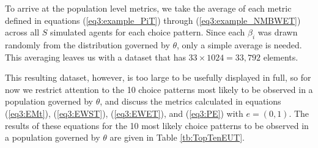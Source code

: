 \documentclass[../main.tex]{subfiles}
\begin{document}
To arrive at the population level metrics, we take the average of each metric defined in equations (\ref{eq3:example_PiT}) through (\ref{eq3:example_NMBWET}) across all $S$ simulated agents for each choice pattern.
Since each $\beta_i$ was drawn randomly from the distribution governed by $\theta$, only a simple average is needed.
This averaging leaves us with a dataset that has $33 \times 1024 = 33,792$ elements.

This resulting dataset, however, is too large to be usefully displayed in full, so for now we restrict attention to the 10 choice patterns most likely to be observed in a population governed by $\theta$, and discuss the metrics calculated in equations (\ref{eq3:EMt}), (\ref{eq3:EWST}), (\ref{eq3:EWET}), and (\ref{eq3:PE}) with $e = (0,1)$.
The results of these equations for the 10 most likely choice patterns to be observed in a population governed by $\theta$ are given in Table \ref{tb:TopTenEUT}.
\end{document}
